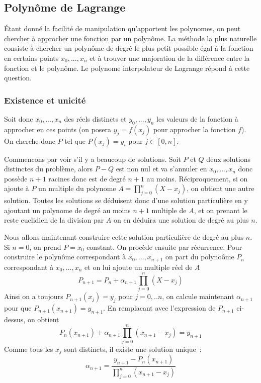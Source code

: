 \documentclass[a4paper,11pt]{article}
\begin{document}
\begin{giacjshere}
\subsection{Polyn\^ome de Lagrange} 
\'Etant donn\'e la facilit\'e de manipulation qu'apportent les
polynomes, on peut chercher \`a approcher une fonction par un
polyn\^ome. La m\'ethode la plus naturelle consiste \`a chercher
un polyn\^ome de degr\'e le plus petit possible
\'egal \`a la fonction en certains points $x_0,...,x_n$
et \`a trouver une majoration de la diff\'erence entre la fonction
et le polyn\^ome.
Le polynome interpolateur de Lagrange r\'epond \`a cette question.

\subsubsection{Existence et unicit\'e}
Soit donc $x_0,...,x_n$ des r\'eels distincts et $y_0,...,y_n$
les valeurs de la fonction \`a approcher en ces points (on posera
$y_j=f(x_j)$ pour approcher la fonction $f$). On cherche
donc $P$ tel que $P(x_j)=y_i$ pour $j \in [0,n]$.

Commencons par voir s'il y a beaucoup de solutions. Soit $P$ et $Q$
deux solutions distinctes du probl\`eme, alors $P-Q$ est non nul
et va s'annuler en $x_0, ...,x_n$ donc poss\`ede $n+1$ racines donc
est de degr\'e $n+1$ au moins. R\'eciproquement, si on ajoute
\`a $P$ un multiple du polynome $A=\prod_{j=0}^n (X-x_j)$, on obtient
une autre solution. Toutes les solutions se d\'eduisent donc
d'une solution particuli\`ere en y ajoutant un polynome de degr\'e
au moins $n+1$ multiple de $A$, et on prenant le
reste euclidien de la division par $A$ on en d\'eduira une solution de
degr\'e au plus $n$.

Nous allons maintenant construire
cette solution particuli\`ere de degr\'e au plus $n$.
Si $n=0$, on prend $P=x_0$ constant. On proc\`ede ensuite par
r\'ecurrence. Pour construire le polyn\^ome correspondant
\`a $x_0,...,x_{n+1}$ on part du polyno\^ome $P_n$ correspondant \`a
$x_0,...,x_{n}$ et on lui ajoute un multiple r\'eel de $A$
\[ P_{n+1}=P_n+ \alpha_{n+1} \prod_{j=0}^n (X-x_j) \]
Ainsi on a toujours $P_{n+1}(x_j)=y_j$ pour $j=0,..n$, on calcule
maintenant $ \alpha_{n+1}$ pour que $P_{n+1}(x_{n+1})=y_{n+1}$.
En remplacant avec l'expression de $P_{n+1}$ ci-dessus, on obtient
\[ P_n(x_{n+1})+  \alpha_{n+1} \prod_{j=0}^n (x_{n+1}-x_j) = y_{n+1} \]
Comme tous les $x_j$ sont distincts, il existe une solution unique~:
\[  \alpha_{n+1}=\frac{y_{n+1}-P_n(x_{n+1})}{\prod_{j=0}^n (x_{n+1}-x_j)}\]


\end{giacjshere}
\end{document}
